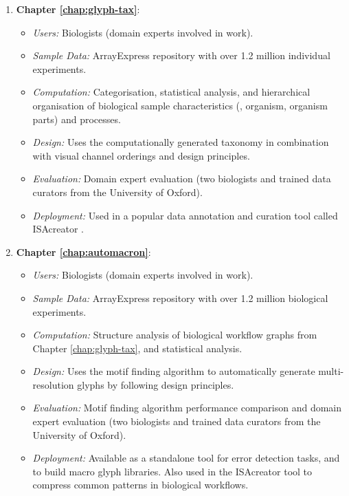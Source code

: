 \begin{enumerate}

\item \textbf{Chapter \ref{chap:glyph-tax}}:
\begin{itemize}
\item \emph{Users:} Biologists (domain experts involved in work).
\item \emph{Sample Data:} ArrayExpress \cite{ArrayExpress::2012} repository with over 1.2 million individual experiments.
\item \emph{Computation:} Categorisation, statistical analysis, and hierarchical organisation of biological sample characteristics (\eg, organism, organism parts) and processes.
\item \emph{Design:} Uses the computationally generated taxonomy in combination with visual channel orderings and design principles.
\item \emph{Evaluation:} Domain expert evaluation (two biologists and trained data curators from the University of Oxford).
\item \emph{Deployment:} Used in a popular data annotation and curation tool called ISAcreator \cite{rocca-serra10}.
\end{itemize}

\item \textbf{Chapter \ref{chap:automacron}}:
\begin{itemize}
\item \emph{Users:} Biologists (domain experts involved in work).
\item \emph{Sample Data:} ArrayExpress \cite{ArrayExpress::2012} repository with over 1.2 million biological experiments.
\item \emph{Computation:} Structure analysis of biological workflow graphs from Chapter \ref{chap:glyph-tax}, and statistical analysis.
\item \emph{Design:} Uses the motif finding algorithm to automatically generate multi-resolution glyphs by following design principles.
\item \emph{Evaluation:} Motif finding algorithm performance comparison and domain expert evaluation (two biologists and trained data curators from the University of Oxford).
\item \emph{Deployment:} Available as a standalone tool for error detection tasks, and to build macro glyph libraries.
Also used in the ISAcreator \cite{rocca-serra10} tool to compress common patterns in biological workflows.
\end{itemize}


\end{enumerate}
